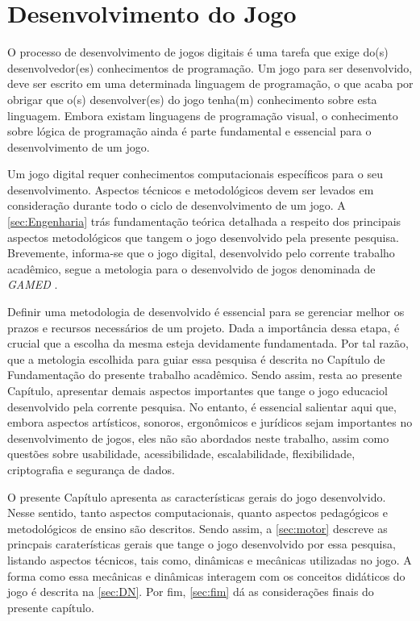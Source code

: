 \chapter{Desenvolvimento do Jogo}\label{ch:Desenvolvimento}


O processo de desenvolvimento de jogos digitais é uma tarefa que exige do(s) desenvolvedor(es) conhecimentos de programação. Um jogo para ser desenvolvido, deve ser escrito em uma determinada linguagem de programação, o que acaba por obrigar que o(s) desenvolver(es) do jogo tenha(m) conhecimento sobre esta linguagem. Embora existam linguagens de programação visual, o conhecimento sobre lógica de programação ainda é parte fundamental e essencial para o desenvolvimento de um jogo. 


Um jogo digital requer conhecimentos computacionais específicos para o seu desenvolvimento. Aspectos técnicos e metodológicos devem ser levados em consideração durante todo o ciclo de desenvolvimento de um jogo. A \autoref{sec:Engenharia} trás fundamentação teórica detalhada a respeito dos principais aspectos metodológicos que tangem o jogo desenvolvido pela presente pesquisa. Brevemente, informa-se que o jogo digital, desenvolvido pelo corrente trabalho acadêmico, segue a metologia para o desenvolvido de jogos denominada de \textit{GAMED} \cite{aslan2016digital}. 

Definir uma metodologia de desenvolvido é essencial para se gerenciar melhor os prazos e recursos necessários de um projeto. Dada a importância dessa etapa, é crucial que a escolha da mesma esteja devidamente fundamentada. Por tal razão, que a metologia escolhida para guiar essa pesquisa é descrita no Capítulo de Fundamentação do presente trabalho acadêmico. Sendo assim, resta ao presente Capítulo, apresentar demais aspectos importantes que tange o jogo educaciol desenvolvido pela corrente pesquisa. No entanto, é essencial salientar aqui que, embora aspectos artísticos, sonoros, ergonômicos e jurídicos sejam importantes no desenvolvimento de jogos, eles não são abordados neste trabalho, assim como questões sobre usabilidade, acessibilidade, escalabilidade, flexibilidade, criptografia e segurança de dados.



O presente Capítulo apresenta as características gerais do jogo desenvolvido. Nesse sentido, tanto aspectos computacionais, quanto aspectos pedagógicos e metodológicos de ensino são descritos. Sendo assim, a \autoref{sec:motor} descreve as princpais caraterísticas gerais que tange o jogo desenvolvido por essa pesquisa, listando aspectos técnicos, tais como, dinâmicas e mecânicas utilizadas no jogo. A forma como essa mecânicas e dinâmicas interagem com os conceitos didáticos do jogo é descrita na \autoref{sec:DN}. Por fim, \autoref{sec:fim} dá as considerações finais do presente capítulo. 



